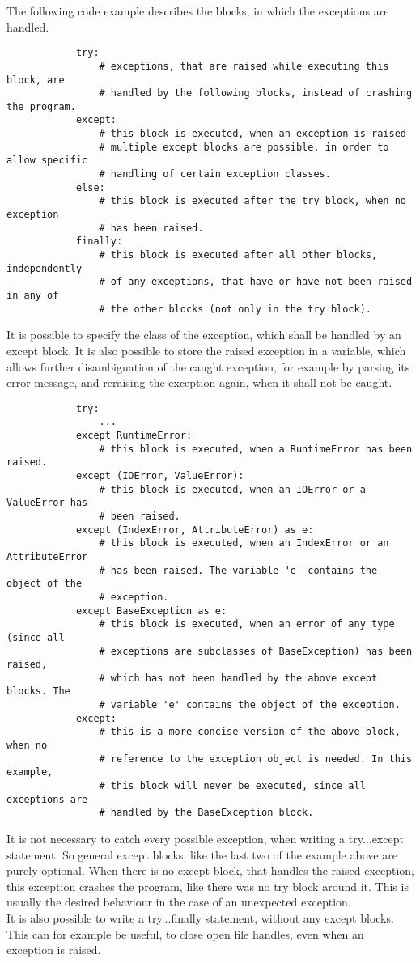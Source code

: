 		The following code example describes the blocks, in which the exceptions are handled.
		\begin{verbatim}
			try:
				# exceptions, that are raised while executing this block, are
				# handled by the following blocks, instead of crashing the program.
			except:
				# this block is executed, when an exception is raised
				# multiple except blocks are possible, in order to allow specific
				# handling of certain exception classes.
			else:
				# this block is executed after the try block, when no exception
				# has been raised.
			finally:
				# this block is executed after all other blocks, independently
				# of any exceptions, that have or have not been raised in any of
				# the other blocks (not only in the try block).
		\end{verbatim}

		It is possible to specify the class of the exception, which shall be handled by an {\normalfont \ttfamily except} block.
		It is also possible to store the raised exception in a variable, which allows further disambiguation of the caught exception, for example by parsing its error message, and reraising the exception again, when it shall not be caught.
		\begin{verbatim}
			try:
				...
			except RuntimeError:
				# this block is executed, when a RuntimeError has been raised.
			except (IOError, ValueError):
				# this block is executed, when an IOError or a ValueError has
				# been raised.
			except (IndexError, AttributeError) as e:
				# this block is executed, when an IndexError or an AttributeError
				# has been raised. The variable 'e' contains the object of the
				# exception.
			except BaseException as e:
				# this block is executed, when an error of any type (since all
				# exceptions are subclasses of BaseException) has been raised,
				# which has not been handled by the above except blocks. The
				# variable 'e' contains the object of the exception.
			except:
				# this is a more concise version of the above block, when no
				# reference to the exception object is needed. In this example,
				# this block will never be executed, since all exceptions are
				# handled by the BaseException block.
		\end{verbatim}

		It is not necessary to catch every possible exception, when writing a {\normalfont \ttfamily try...except} statement.
		So general {\normalfont \ttfamily except} blocks, like the last two of the example above are purely optional.
		When there is no {\normalfont \ttfamily except} block, that handles the raised exception, this exception crashes the program, like there was no {\normalfont \ttfamily try} block around it.
		This is usually the desired behaviour in the case of an unexpected exception.\\
		It is also possible to write a {\normalfont \ttfamily try...finally} statement, without any {\normalfont \ttfamily except} blocks.
		This can for example be useful, to close open file handles, even when an exception is raised.


